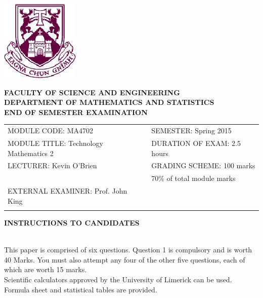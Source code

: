 ﻿ \documentclass[a4paper,12pt]{article}
\begin{document}
\begin{center}
       \includegraphics[scale=0.60]{shieldtransparent2}
\end{center}

\begin{center}
\vspace{1cm}
\large \bf {FACULTY OF SCIENCE AND ENGINEERING} \\[0.5cm]
\normalsize DEPARTMENT OF MATHEMATICS AND STATISTICS \\[1.25cm]
\large \bf {END OF SEMESTER EXAMINATION} \\[1.5cm]
\end{center}

\begin{tabular}{ll}
MODULE CODE: MA4702 & SEMESTER: Spring 2015\\[1cm]
MODULE TITLE: Technology Mathematics 2 & DURATION OF EXAM: 2.5 hours \\[1cm]
LECTURER: Kevin O'Brien & GRADING SCHEME: 100 marks\\
 & \phantom{GRADING SCHEME:} \footnotesize {70\% of total module marks}   \\[0.8cm]
EXTERNAL EXAMINER: Prof. John King & \\[1cm]
\\[1cm]
\end{tabular}
\begin{center}
{\bf INSTRUCTIONS TO CANDIDATES}
\end{center}

{\noindent \\ This paper is comprised of six questions. Question 1 is compulsory and is worth 40 Marks.  You must also attempt any four of the other five questions, each of which are worth 15 marks.
\\ Scientific calculators approved by the University of Limerick can be used. 
\\ Formula sheet and statistical tables are provided.
}
\normalsize
\newpage
\end{document}

